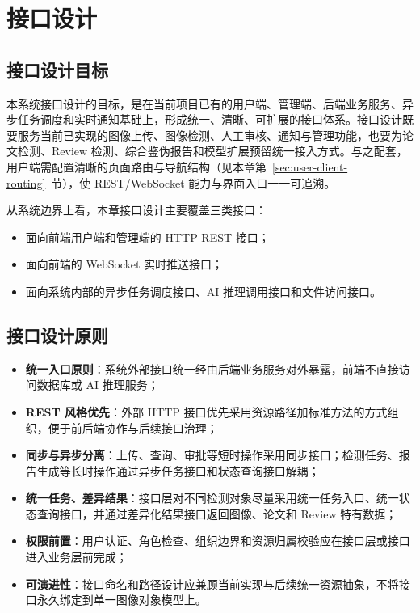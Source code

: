\section{接口设计}

\subsection{接口设计目标}
本系统接口设计的目标，是在当前项目已有的用户端、管理端、后端业务服务、异步任务调度和实时通知基础上，形成统一、清晰、可扩展的接口体系。接口设计既要服务当前已实现的图像上传、图像检测、人工审核、通知与管理功能，也要为论文检测、Review 检测、综合鉴伪报告和模型扩展预留统一接入方式。与之配套，用户端需配置清晰的页面路由与导航结构（见本章第~\ref{sec:user-client-routing}~节），使 REST/WebSocket 能力与界面入口一一可追溯。

从系统边界上看，本章接口设计主要覆盖三类接口：
\begin{itemize}[leftmargin=2em]
    \item 面向前端用户端和管理端的 HTTP REST 接口；
    \item 面向前端的 WebSocket 实时推送接口；
    \item 面向系统内部的异步任务调度接口、AI 推理调用接口和文件访问接口。
\end{itemize}

\subsection{接口设计原则}
\begin{itemize}[leftmargin=2em]
    \item \textbf{统一入口原则}：系统外部接口统一经由后端业务服务对外暴露，前端不直接访问数据库或 AI 推理服务；
    \item \textbf{REST 风格优先}：外部 HTTP 接口优先采用资源路径加标准方法的方式组织，便于前后端协作与后续接口治理；
    \item \textbf{同步与异步分离}：上传、查询、审批等短时操作采用同步接口；检测任务、报告生成等长时操作通过异步任务接口和状态查询接口解耦；
    \item \textbf{统一任务、差异结果}：接口层对不同检测对象尽量采用统一任务入口、统一状态查询接口，并通过差异化结果接口返回图像、论文和 Review 特有数据；
    \item \textbf{权限前置}：用户认证、角色检查、组织边界和资源归属校验应在接口层或接口进入业务层前完成；
    \item \textbf{可演进性}：接口命名和路径设计应兼顾当前实现与后续统一资源抽象，不将接口永久绑定到单一图像对象模型上。
\end{itemize}

